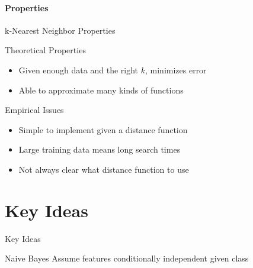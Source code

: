 \documentclass[14pt]{beamer}
\begin{document}
\subsection{Properties}
\begin{frame}[<+->]{k-Nearest Neighbor Properties}
	\begin{block}{Theoretical Properties}
		\begin{itemize}
			\item Given enough data and the right $k$, minimizes error
			\item Able to approximate many kinds of functions
		\end{itemize}
	\end{block}
	\begin{block}{Empirical Issues}
		\begin{itemize}
			\item Simple to implement given a distance function
			\item Large training data means long search times
			\item Not always clear what distance function to use
		\end{itemize}
	\end{block}
\end{frame}


\part{Key Ideas}
\begin{frame}{Key Ideas}
	\begin{block}{Naive Bayes}
		Assume features conditionally independent given class
	\end{block}
\end{frame}
\end{document}
